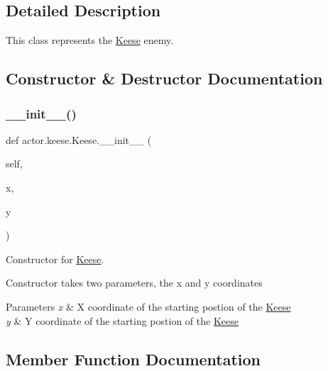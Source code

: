 \subsection{Detailed Description}
This class represents the \hyperlink{classactor_1_1keese_1_1_keese}{Keese} enemy. 

\subsection{Constructor \& Destructor Documentation}
\mbox{\label{classactor_1_1keese_1_1_keese_a5a6d46ac05ff7500ab07e0494ddbe3ce}} 
\subsubsection{\texorpdfstring{\+\_\+\+\_\+init\+\_\+\+\_\+()}{\_\_init\_\_()}}
{\footnotesize\ttfamily def actor.\+keese.\+Keese.\+\_\+\+\_\+init\+\_\+\+\_\+ (\begin{DoxyParamCaption}\item[{}]{self,  }\item[{}]{x,  }\item[{}]{y }\end{DoxyParamCaption})}



Constructor for \hyperlink{classactor_1_1keese_1_1_keese}{Keese}. 

Constructor takes two parameters, the x and y coordinates 
\begin{DoxyParams}{Parameters}
{\em x} & X coordinate of the starting postion of the \hyperlink{classactor_1_1keese_1_1_keese}{Keese} \\
\hline
{\em y} & Y coordinate of the starting postion of the \hyperlink{classactor_1_1keese_1_1_keese}{Keese} \\
\hline
\end{DoxyParams}


\subsection{Member Function Documentation}
\mbox{\label{classactor_1_1keese_1_1_keese_a2c191c26fc310458619fdf49166e8434}} 
